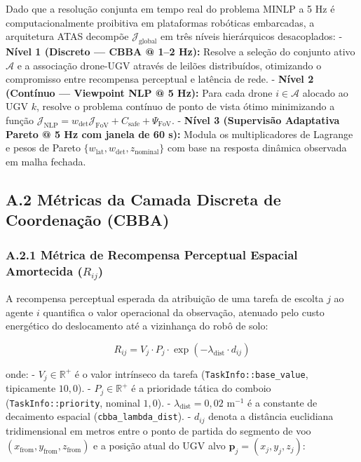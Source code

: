 \documentclass[
  brazilian,
  a4paper]{article}
\begin{document}
Dado que a resolução conjunta em tempo real do problema MINLP a 5 Hz é
computacionalmente proibitiva em plataformas robóticas embarcadas, a
arquitetura ATAS decompõe \(\mathcal{J}_{\text{global}}\) em três níveis
hierárquicos desacoplados: - \textbf{Nível 1 (Discreto --- CBBA @ 1--2
Hz):} Resolve a seleção do conjunto ativo \(\mathcal{A}\) e a associação
drone-UGV através de leilões distribuídos, otimizando o compromisso
entre recompensa perceptual e latência de rede. - \textbf{Nível 2
(Contínuo --- Viewpoint NLP @ 5 Hz):} Para cada drone
\(i \in \mathcal{A}\) alocado ao UGV \(k\), resolve o problema contínuo
de ponto de vista ótimo minimizando a função
\(\mathcal{J}_{\text{NLP}} = w_{\text{det}} \mathcal{J}_{\text{FoV}} + C_{\text{safe}} + \Psi_{\text{FoV}}\).
- \textbf{Nível 3 (Supervisão Adaptativa Pareto @ 5 Hz com janela de 60
s):} Modula os multiplicadores de Lagrange e pesos de Pareto
\(\{w_{\text{lat}}, w_{\text{det}}, z_{\text{nominal}}\}\) com base na
resposta dinâmica observada em malha fechada.

\subsection{A.2 Métricas da Camada Discreta de Coordenação
(CBBA)}\label{a.2-muxe9tricas-da-camada-discreta-de-coordenauxe7uxe3o-cbba}

\subsubsection{\texorpdfstring{A.2.1 Métrica de Recompensa Perceptual
Espacial Amortecida
(\(R_{ij}\))}{A.2.1 Métrica de Recompensa Perceptual Espacial Amortecida (R\_\{ij\})}}\label{a.2.1-muxe9trica-de-recompensa-perceptual-espacial-amortecida-r_ij}

A recompensa perceptual esperada da atribuição de uma tarefa de escolta
\(j\) ao agente \(i\) quantifica o valor operacional da observação,
atenuado pelo custo energético do deslocamento até a vizinhança do robô
de solo:

\[R_{ij} = V_j \cdot P_j \cdot \exp\left(-\lambda_{\text{dist}} \cdot d_{ij}\right)\]

onde: - \(V_j \in \mathbb{R}^+\) é o valor intrínseco da tarefa
(\texttt{TaskInfo:\allowbreak{}:\allowbreak{}base\_\allowbreak{}value}, tipicamente \(10{,}0\)). -
\(P_j \in \mathbb{R}^+\) é a prioridade tática do comboio
(\texttt{TaskInfo:\allowbreak{}:\allowbreak{}priority}, nominal \(1{,}0\)). -
\(\lambda_{\text{dist}} = 0{,}02\text{ m}^{-1}\) é a constante de
decaimento espacial (\texttt{cbba\_\allowbreak{}lambda\_\allowbreak{}dist}). - \(d_{ij}\) denota a
distância euclidiana tridimensional em metros entre o ponto de partida
do segmento de voo
\((x_{\text{from}}, y_{\text{from}}, z_{\text{from}})\) e a posição
atual do UGV alvo \(\mathbf{p}_j = (x_j, y_j, z_j)\):
\end{document}
